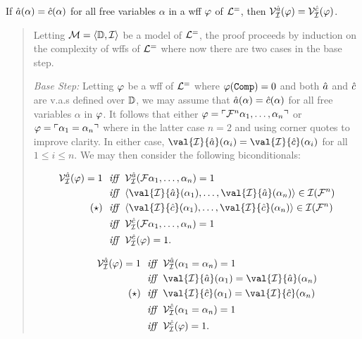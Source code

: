 \vspace{.05in}
\begin{Lthm} \label{lemma:VarAgree}
  If $\hat{a}(\alpha)=\hat{c}(\alpha)$ for all free variables $\alpha$ in a wff $\varphi$ of $\mathcal{L}^{=}$, then $\mathcal{V}_{\mathcal{I}}^{\hat{a}}(\varphi)=\mathcal{V}_{\mathcal{I}}^{\hat{c}}(\varphi)$.
\end{Lthm}

\begin{quote}
  Letting $\mathcal{M} = \langle\mathbb{D}, \mathcal{I}\rangle$ be a model of $\mathcal{L}^{=}$, the proof proceeds by induction on the complexity of wffs of $\mathcal{L}^{=}$ where now there are two cases in the base step.

  \textit{Base Step:}
  Letting $\varphi$ be a wff of $\mathcal{L}^{=}$ where $\varphi(\texttt{Comp}) = 0$ and both $\hat{a}$ and $\hat{c}$ are v.a.s defined over $\mathbb{D}$, we may assume that $\hat{a}(\alpha)=\hat{c}(\alpha)$ for all free variables $\alpha$ in $\varphi$.
  It follows that either $\varphi = \ulcorner\mathcal{F}^n\alpha_1,\ldots,\alpha_n\urcorner$ or $\varphi = \ulcorner\alpha_1 = \alpha_n\urcorner$ where in the latter case $n = 2$ and using corner quotes to improve clarity.
  In either case, $\val{\I}{\va{a}}(\alpha_i) = \val{\I}{\va{c}}(\alpha_i)$ for all $1 \leq i \leq n$. 
  We may then consider the following biconditionals:

  \begin{multicols}{2}
    \begin{align*}
      \VV{\I}{\va{a}}(\metaA) = 1
        ~~\textit{iff}~~  & \VV{\I}{\va{a}}(\F\alpha_1,\ldots,\alpha_n) = 1\\
        ~~\textit{iff}~~  & \tuple{\val{\I}{\va{a}}(\alpha_1),\ldots,\val{\I}{\va{a}}(\alpha_n)} \in \I(\F^n)\\
        (\star) ~~\textit{iff}~~  & \tuple{\val{\I}{\va{c}}(\alpha_1),\ldots,\val{\I}{\va{c}}(\alpha_n)} \in \I(\F^n)\\
        ~~\textit{iff}~~  & \VV{\I}{\va{c}}(\F\alpha_1,\ldots,\alpha_n) = 1\\
        ~~\textit{iff}~~  & \VV{\I}{\va{c}}(\metaA) = 1.
    \end{align*}

    \begin{align*}
      \strut\quad\quad
      \VV{\I}{\va{a}}(\metaA) = 1
        ~~\textit{iff}~~  & \VV{\I}{\va{a}}(\alpha_1 = \alpha_n) = 1\\
        ~~\textit{iff}~~  & \val{\I}{\va{a}}(\alpha_1) = \val{\I}{\va{a}}(\alpha_n)\\
        (\star) ~~\textit{iff}~~  & \val{\I}{\va{c}}(\alpha_1) = \val{\I}{\va{c}}(\alpha_n)\\
        ~~\textit{iff}~~  & \VV{\I}{\va{c}}(\alpha_1 = \alpha_n) = 1\\
        ~~\textit{iff}~~  & \VV{\I}{\va{c}}(\metaA) = 1.
    \end{align*}
  \end{multicols}


\end{quote}
